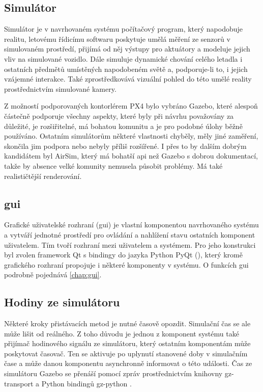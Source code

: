     \subsection{Simulátor}
      Simulátor je v navrhovaném systému počítačový program, který napodobuje realitu, letovému řídicímu softwaru poskytuje umělá měření ze senzorů v simulovaném prostředí, přijímá od něj výstupy pro aktuátory a modeluje jejich vliv na simulované vozidlo. Dále simuluje dynamické chování celého letadla i ostatních předmětů umístěných napodobeném světě a, podporuje-li to, i jejich vzájemné interakce. Také zprostředkovává vizuální pohled do této umělé reality prostřednictvím simulované kamery.

      Z možností podporovaných kontorlérem PX4 bylo vybráno Gazebo, které alespoň částečně podporuje všechny aspekty, které byly při návrhu považovány za důležité, je rozšiřitelné, má bohatou komunitu a je pro podobné úlohy běžně používáno. Ostatním simulátorům některé vlastnosti chyběly, měly jiné zaměření, skončila jim podpora nebo nebyly příliš rozšířené. I přes to by dalším dobrým kandidátem byl AirSim, který má bohatší \acrshort{api} než Gazebo s dobrou dokumentací, takže by absence velké komunity nemusela působit problémy. Má také realističtější renderování.
    \subsection{\acrshort{gui}}
      Grafické uživatelské rozhraní (\acrshort{gui}) je vlastní komponentou navrhovaného systému a vytváří jednotné prostředí pro ovládání a nahlížení stavu ostatních komponent uživatelem. Tím tvoří rozhraní mezi uživatelem a systémem. Pro jeho konstrukci byl zvolen framework Qt s bindingy do jazyka Python PyQt (\cite{pyqt}), který kromě grafického rozhraní propojuje i některé komponenty v systému. O funkcích \acrshort{gui} podrobně pojednává \cref{chap:gui}. 
    \subsection{Hodiny ze simulátoru}
      Některé kroky přistávacích metod je nutné časově opozdit. Simulační čas se ale může lišit od reálného. Z toho důvodu je jednou z komponent systému také přijímač hodinového signálu ze simulátoru, který ostatním komponentám může poskytovat časovač. Ten se aktivuje po uplynutí stanovené doby v simulačním čase a může danou komponentu asynchronně informovat o této události. Čas ze simulátoru Gazebo se přenáší pomocí zpráv prostřednictvím knihovny gz-transport a Python bindingů gz-python \cite{gz-python}. 
